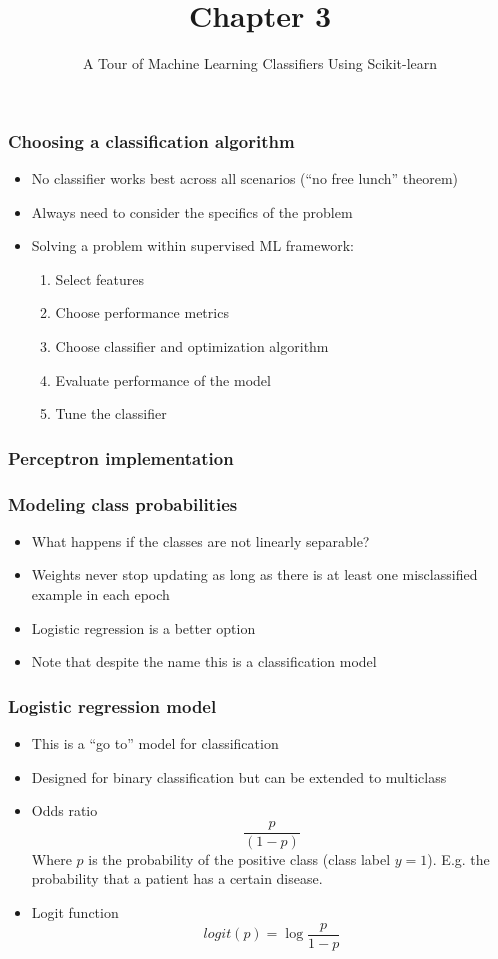 \documentclass{beamer}
\title{Chapter 3}
\subtitle{A Tour of Machine Learning Classifiers Using Scikit-learn}
\begin{document}
\maketitle

\begin{frame}
  \frametitle{Choosing a classification algorithm}
  \begin{itemize}
  \item No classifier works best across all scenarios (``no free lunch'' theorem)
  \item Always need to consider the specifics of the problem
  \item Solving a problem within supervised ML framework:
    \begin{enumerate}
    \item Select features
    \item Choose performance metrics
    \item Choose classifier and optimization algorithm
    \item Evaluate performance of the model
    \item Tune the classifier
    \end{enumerate}
  \end{itemize}
\end{frame}

\begin{frame}
  \frametitle{Perceptron implementation} \href{https://github.com/rasbt/python-machine-learning-book/blob/master/code/ch03/ch03.ipynb}{}
\end{frame}

\begin{frame}
  \frametitle{Modeling class probabilities}
  \begin{itemize}
  \item What happens if the classes are not linearly separable?
  \item Weights never stop updating as long as there is at least one misclassified example in each epoch
  \item Logistic regression is a better option
    \item Note that despite the name this is a classification model
  \end{itemize}
\end{frame}

\begin{frame}
  \frametitle{Logistic regression model}
  \begin{itemize}
  \item This is a ``go to'' model for classification
  \item Designed for binary classification but can be extended to multiclass
  \item Odds ratio
    \[
    \frac{p}{(1-p)}
    \]
    Where $p$ is the probability of the positive class  (class label $y=1$). E.g. the probability that a patient has a certain disease.
  \item Logit function
    \[
    logit(p) = \log \frac{p}{1-p}
    \]
  \end{itemize}
\end{frame}
\end{document}
